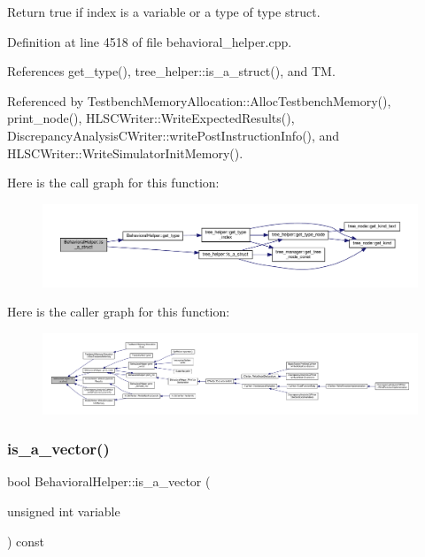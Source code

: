 Return true if index is a variable or a type of type struct. 



Definition at line 4518 of file behavioral\+\_\+helper.\+cpp.



References get\+\_\+type(), tree\+\_\+helper\+::is\+\_\+a\+\_\+struct(), and TM.



Referenced by Testbench\+Memory\+Allocation\+::\+Alloc\+Testbench\+Memory(), print\+\_\+node(), H\+L\+S\+C\+Writer\+::\+Write\+Expected\+Results(), Discrepancy\+Analysis\+C\+Writer\+::write\+Post\+Instruction\+Info(), and H\+L\+S\+C\+Writer\+::\+Write\+Simulator\+Init\+Memory().

Here is the call graph for this function\+:
\nopagebreak
\begin{figure}[H]
\begin{center}
\leavevmode
\includegraphics[width=350pt]{dd/db2/classBehavioralHelper_a4201bb60f819cbef8a2533a5da360991_cgraph}
\end{center}
\end{figure}
Here is the caller graph for this function\+:
\nopagebreak
\begin{figure}[H]
\begin{center}
\leavevmode
\includegraphics[width=350pt]{dd/db2/classBehavioralHelper_a4201bb60f819cbef8a2533a5da360991_icgraph}
\end{center}
\end{figure}
\mbox{\label{classBehavioralHelper_a3aaba4321f615da5c2e5d35de11344b6}} 
\subsubsection{\texorpdfstring{is\+\_\+a\+\_\+vector()}{is\_a\_vector()}}
{\footnotesize\ttfamily bool Behavioral\+Helper\+::is\+\_\+a\+\_\+vector (\begin{DoxyParamCaption}\item[{unsigned int}]{variable }\end{DoxyParamCaption}) const}



